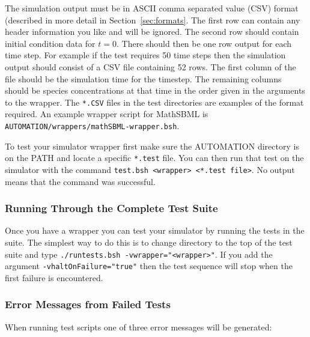 \documentclass{cekarticle}
\begin{document}
The simulation output must be in ASCII comma separated value (CSV)
format (described in more detail in Section~\ref{sec:formats}. The
first row can contain any header information you like and will be
ignored. The second row should contain initial condition data for
$t=0$. There should then be one row output for each time step. For
example if the test requires 50 time steps then the simulation
output should consist of a CSV file containing 52 rows.  The first
column of the file should be the simulation time for the timestep.
The remaining columns should be species concentrations at that
time in the order given in the arguments to the wrapper. The
\texttt{*.CSV} files in the test directories are examples of the
format required.  An example wrapper script for MathSBML is
\texttt{AUTOMATION/wrappers/mathSBML-wrapper.bsh}.

To test your simulator wrapper first make sure the AUTOMATION
directory is on the PATH and locate a specific \texttt{*.test}
file.  You can then run that test on the simulator with the
command \texttt{test.bsh <wrapper> <*.test file>}.  No output
means that the command was successful.

\subsubsection{Running Through the Complete Test Suite}
Once you have a wrapper you can test your simulator by running the
tests in the suite.  The simplest way to do this is to change
directory to the top of the test suite and type
\texttt{./runtests.bsh -vwrapper="<wrapper>"}. If you add the
argument \texttt{-vhaltOnFailure="true"} then the test sequence
will stop when the first failure is encountered.

\subsubsection{Error Messages from Failed Tests}
When running test scripts one of three error messages will be
generated:
\end{document}
